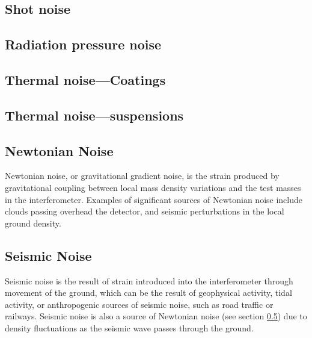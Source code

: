 
\subsection{Shot noise}
\label{sec:shot-noise}

\subsection{Radiation pressure noise}
\label{sec:radi-press-noise}

\subsection{Thermal noise---Coatings}
\label{sec:therm-noise-coat}

\subsection{Thermal noise---suspensions}
\label{sec:therm-noise-susp}


\subsection{Newtonian Noise}
\label{sec:newtonian-noise}

Newtonian noise, or gravitational gradient noise, is the strain
produced by gravitational coupling between local mass density
variations and the test masses in the interferometer. Examples of
significant sources of Newtonian noise include clouds passing overhead
the detector, and seismic perturbations in the local ground density.

\subsection{Seismic Noise}
\label{sec:seismic-noise}

Seismic noise is the result of strain introduced into the
interferometer through movement of the ground, which can be the result
of geophysical activity, tidal activity, or anthropogenic sources of
seismic noise, such as road traffic or railways. Seismic noise is also
a source of Newtonian noise (see section \ref{sec:newtonian-noise})
due to density fluctuations as the seismic wave passes through the
ground.



